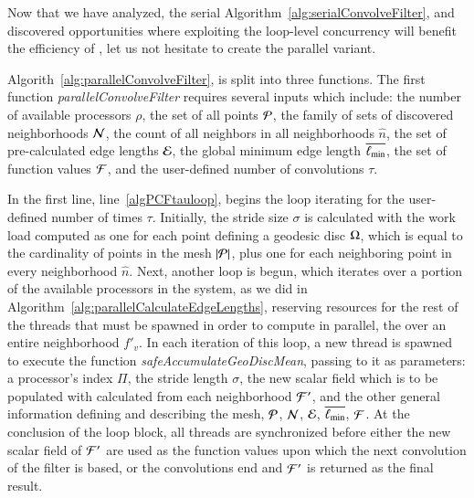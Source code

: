 Now that we have analyzed, the serial Algorithm~\ref{alg:serialConvolveFilter}, and discovered opportunities where exploiting the loop-level concurrency will benefit the efficiency of , let us not hesitate to create the parallel variant.

Algorith~\ref{alg:parallelConvolveFilter}, is split into three functions. The first function \textit{parallelConvolveFilter} requires several inputs which include: the number of available processors $\rho$, the set of all points $\mathcal{P}$, the family of sets of discovered neighborhoods $\mathcal{N}$, the count of all neighbors in all neighborhoods $\hat{n}$, the set of pre-calculated edge lengths $\mathcal{E}$, the global minimum edge length $\overline{\ell_\text{min}}$, the set of function values $\mathcal{F}$, and the user-defined number of convolutions $\tau$.

In the first line, line~\ref{algPCFtauloop}, begins the loop iterating for the user-defined number of times $\tau$. Initially, the stride size $\sigma$ is calculated with the work load computed as one for each point defining a geodesic disc $\Omega$, which is equal to the cardinality of points in the mesh $|\mathcal{P}|$, plus one for each neighboring point in every neighborhood $\hat{n}$. Next, another loop is begun, which iterates over a portion of the available processors in the system, as we did in Algorithm~\ref{alg:parallelCalculateEdgeLengths}, reserving resources for the rest of the threads that must be spawned in order to compute in parallel, the \wmfv{} over an entire neighborhood $f'_v$. In each iteration of this loop, a new thread is spawned to execute the function \textit{safeAccumulateGeoDiscMean}, passing to it as parameters: a processor's index $\Pi$, the stride length $\sigma$, the new scalar field which is to be populated with calculated  from each neighborhood $\mathcal{F}'$, and the other general information defining and describing the mesh, $\mathcal{P}$, $\mathcal{N}$, $\mathcal{E}$, $\overline{\ell_\text{min}}$, $\mathcal{F}$. At the conclusion of the loop block, all threads are synchronized before either the new scalar field of  $\mathcal{F}'$ are used as the function values upon which the next convolution of the filter is based, or the convolutions end and $\mathcal{F}'$ is returned as the final result.

